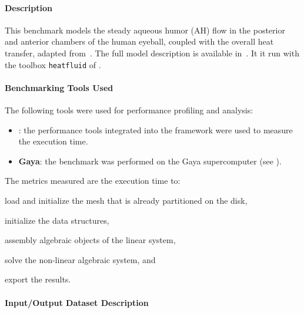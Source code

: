 \newcommand{\vct}[1]{\vec{#1}}
\newcommand{\mat}[1]{\underline{\underline{#1}}}





\paragraph{Description}
This benchmark models the steady aqueous humor (AH) flow in the posterior and anterior chambers of the human eyeball, coupled with the overall heat transfer, adapted from~\cite{ooi_simulation_2008,kilgour_operator_2021}.
The full model description is available in~\cite{saigre_coupled_2024_abstract}.
It it run with the toolbox \texttt{heatfluid} of \Feelpp.


\paragraph{Benchmarking Tools Used}

The following tools were used for performance profiling and analysis:
\begin{itemize}
    \item \textbf{\Feelpp}: the performance tools integrated into the \Feelpp framework were used to measure the execution time.
    \item \textbf{Gaya}: the benchmark was performed on the Gaya supercomputer (see ).
\end{itemize}

The metrics measured are the execution time to:
\begin{inparaenum}[\it (i)]
    \item load and initialize the mesh that is already partitioned on the disk,
    \item initialize the data structures,
    \item assembly algebraic objects of the linear system,
    \item solve the non-linear algebraic system, and
    \item export the results.
\end{inparaenum}


\paragraph{Input/Output Dataset Description}

